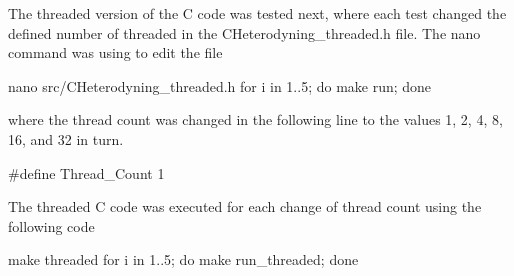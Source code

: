 The threaded version of the C code was tested next, where each test changed the defined number of threaded in the CHeterodyning_threaded.h file. The nano command was using to edit the file

\begin{Cpp}
 nano src/CHeterodyning_threaded.h
 for i in {1..5}; do make run; done
\end{Cpp}

where the thread count was changed in the following line to the values 1, 2, 4, 8, 16, and 32 in turn.

\begin{Cpp}
 #define Thread_Count 1
\end{Cpp}

The threaded C code was executed for each change of thread count using the following code

\begin{Cpp}
 make threaded
 for i in {1..5}; do make run_threaded; done
\end{Cpp}